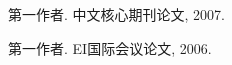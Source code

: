 
\begin{publications}{99}
    \item\textsc{第一作者}. {中文核心期刊论文}, 2007.  
    \item\textsc{第一作者}. {EI国际会议论文}, 2006.
\end{publications}
